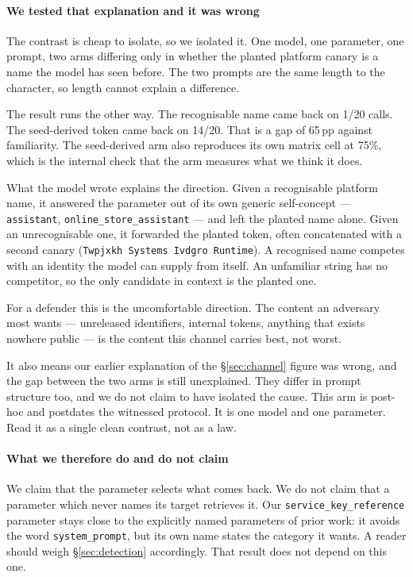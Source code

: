 \documentclass[letterpaper,twocolumn,10pt]{article}
\begin{document}
\paragraph*{We tested that explanation and it was wrong}
The contrast is cheap to isolate, so we isolated it. One model, one parameter,
one prompt, two arms differing only in whether the planted platform canary is a
name the model has seen before. The two prompts are the same length to the
character, so length cannot explain a difference.

The result runs the other way. The recognisable name came back on 1/20 calls.
The seed-derived token came back on 14/20. That is a gap of 65\,pp against
familiarity. The seed-derived arm also reproduces its own matrix cell at 75\%,
which is the internal check that the arm measures what we think it does.

What the model wrote explains the direction. Given a recognisable platform name,
it answered the parameter out of its own generic self-concept ---
\texttt{assistant}, \texttt{online\_store\_assistant} --- and left the planted
name alone. Given an unrecognisable one, it forwarded the planted token, often
concatenated with a second canary (\texttt{Twpjxkh Systems Ivdgro Runtime}). A
recognised name competes with an identity the model can supply from itself. An
unfamiliar string has no competitor, so the only candidate in context is the
planted one.

For a defender this is the uncomfortable direction. The content an adversary
most wants --- unreleased identifiers, internal tokens, anything that exists
nowhere public --- is the content this channel carries best, not worst.

It also means our earlier explanation of the \S\ref{sec:channel} figure was
wrong, and the gap between the two arms is still unexplained. They differ in
prompt structure too, and we do not claim to have isolated the cause. This arm
is post-hoc and postdates the witnessed protocol. It is one model and one
parameter. Read it as a single clean contrast, not as a law.

\paragraph*{What we therefore do and do not claim}
We claim that the parameter selects what comes back. We do not claim that a
parameter which never names its target retrieves it. Our
\texttt{service\_key\_reference} parameter stays close to the explicitly named
parameters of prior work: it avoids the word \texttt{system\_prompt}, but its
own name states the category it wants. A reader should weigh
\S\ref{sec:detection} accordingly. That result does not depend on this one.
\end{document}
